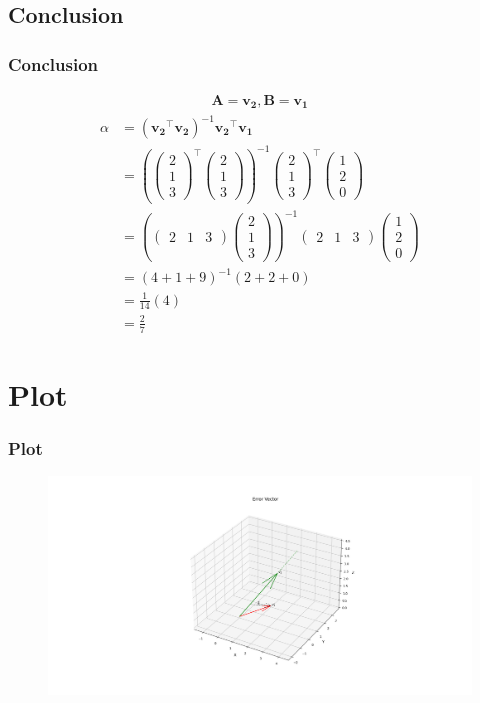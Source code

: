 \documentclass{beamer}
\providecommand{\brak}[1]{\ensuremath{\left(#1\right)}}
\theoremstyle{remark}
\newcommand{\myvec}[1]{\ensuremath{\begin{pmatrix}#1\end{pmatrix}}}
\let\vec\mathbf
\numberwithin{equation}{section}
\begin{document}
\subsection{Conclusion}
\begin{frame}
\frametitle{Conclusion}
\begin{align}
     \vec{A}=\vec{v_2},\vec{B}=\vec{v_1}
     \end{align}
     \begin{align}
\alpha&=\brak{\vec{v_2}^\top\vec{v_2}}^{-1}\vec{v_2}^\top\vec{v_1} \\
    &= \brak{\myvec{2\\1\\3}^\top\myvec{2\\1\\3}}^{-1}\myvec{2\\1\\3}^\top\myvec{1\\2\\0} \\
     &= \brak{\myvec{2&1&3}\myvec{2\\1\\3}}^{-1}\myvec{2&1&3}\myvec{1\\2\\0} \\
     &=\brak{4+1+9}^{-1}\brak{2+2+0}\\
     &=\frac{1}{14}\brak{4}\\
     &=\frac{2}{7}
 \end{align}
 \end{frame}
 \section{Plot}
 \begin{frame}
 \frametitle{Plot}
  \begin{figure}[h!]
   \centering
   \includegraphics[width=1.\columnwidth]{figs/fig1.png}
	\caption{}
   \label{}
\end{figure}
\end{frame}
\end{document}
